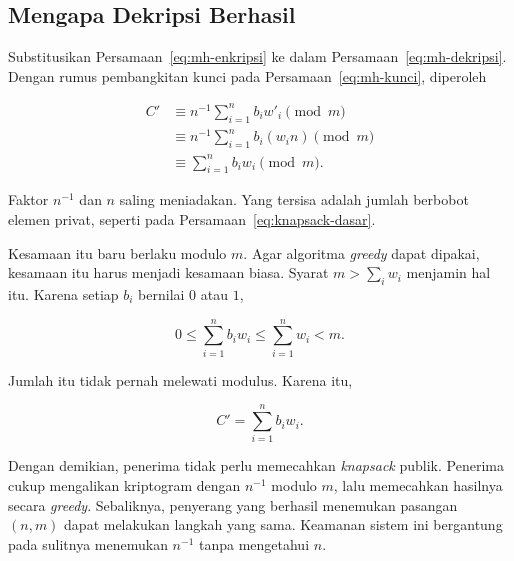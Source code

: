 \subsection{Mengapa Dekripsi Berhasil}
\label{subsec:bukti-knapsack}

Substitusikan Persamaan~\eqref{eq:mh-enkripsi} ke dalam
Persamaan~\eqref{eq:mh-dekripsi}. Dengan rumus pembangkitan kunci pada
Persamaan~\eqref{eq:mh-kunci}, diperoleh

\begin{equation}
\begin{split}
C' &\equiv n^{-1} \sum_{i=1}^{n} b_i w'_i \pmod{m} \\
   &\equiv n^{-1} \sum_{i=1}^{n} b_i (w_i n) \pmod{m} \\
   &\equiv \sum_{i=1}^{n} b_i w_i \pmod{m} .
\end{split}
\label{eq:mh-bukti}
\end{equation}

Faktor $n^{-1}$ dan $n$ saling meniadakan. Yang tersisa adalah jumlah berbobot
elemen privat, seperti pada Persamaan~\eqref{eq:knapsack-dasar}.

Kesamaan itu baru berlaku modulo $m$. Agar algoritma \textit{greedy} dapat
dipakai, kesamaan itu harus menjadi kesamaan biasa. Syarat $m > \sum_i w_i$
menjamin hal itu. Karena setiap $b_i$ bernilai $0$ atau $1$,

\[ 0 \le \sum_{i=1}^{n} b_i w_i \le \sum_{i=1}^{n} w_i < m . \]

Jumlah itu tidak pernah melewati modulus. Karena itu,

\begin{equation}
C' = \sum_{i=1}^{n} b_i w_i .
\label{eq:mh-bukti-eksak}
\end{equation}

Dengan demikian, penerima tidak perlu memecahkan \textit{knapsack} publik.
Penerima cukup mengalikan kriptogram dengan $n^{-1}$ modulo $m$, lalu
memecahkan hasilnya secara \textit{greedy}. Sebaliknya, penyerang yang berhasil
menemukan pasangan $(n, m)$ dapat melakukan langkah yang sama. Keamanan sistem
ini bergantung pada sulitnya menemukan $n^{-1}$ tanpa mengetahui $n$.


